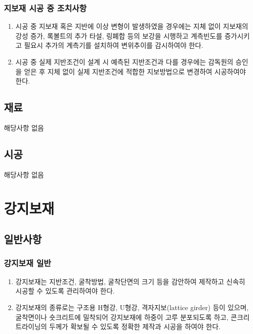 \documentclass[12pt,a4paper]{article}
\begin{document}
\subsubsection{지보재 시공 중 조치사항}
\begin{enumerate}
\item  시공 중 지보재 혹은 지반에 이상 변형이 발생하였을 경우에는 지체 없이 지보재의 강성 증가, 록볼트의 추가 타설, 링폐합 등의 보강을 시행하고 계측빈도를 증가시키고 필요시 추가의 계측기를 설치하여 변위추이를 감시하여야 한다.  
\item  시공 중 실제 지반조건이 설계 시 예측된 지반조건과 다를 경우에는 감독원의 승인을 얻은 후 지체 없이 실제 지반조건에 적합한 지보방법으로 변경하여 시공하여야 한다.  
\end{enumerate}

\subsection{재료}
해당사항 없음  

\subsection{시공}
해당사항 없음  

%
%
%

\newpage
\section{강지보재}

\subsection{일반사항}

\subsubsection{강지보재 일반}
\begin{enumerate}
\item 강지보재는 지반조건, 굴착방법, 굴착단면의 크기 등을 감안하여 제작하고 신속히 시공할 수 있도록 관리하여야 한다.  
\item 강지보재의 종류로는 구조용 H형강, U형강, 격자지보(lattice girder) 등이 있으며, 굴착면이나 숏크리트에 밀착되어 강지보재에 하중이 고루 분포되도록 하고, 콘크리트라이닝의 두께가 확보될 수 있도록 정확한 제작과 시공을 하여야 한다.  
\end{enumerate}
\end{document}
